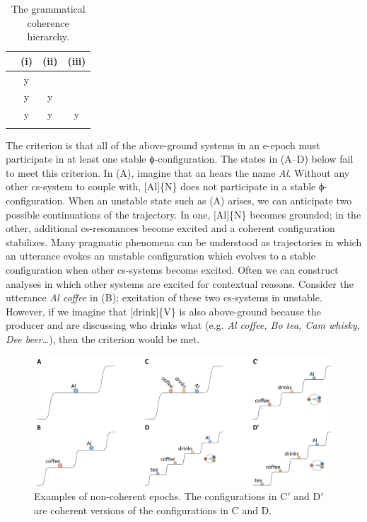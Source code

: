 \begin{table}
\begin{tabularx}{.66\textwidth}{rCCC}
\lsptoprule
& (i) & (ii) & (iii)\\
\midrule 
\raggedleft {} & y &  & \\
\raggedleft {} & y & y & \\
\raggedleft {} & y & y & y\\
\lspbottomrule
\end{tabularx}
\caption{The grammatical coherence hierarchy.}\label{tab:6:1}
\end{table}
  The  criterion is that all of the above-ground systems in an e-epoch must participate in at least one stable ϕ-con\-fi\-gu\-ra\-tion. The states in {}(A--D) below fail to meet this criterion. In (A), imagine that an  hears the name \textit{Al}. Without any other cs-sys\-tem to couple with, [Al]\{N\} does not participate in a stable ϕ-con\-fi\-gu\-ra\-tion. When an unstable state such as (A) arises, we can anticipate two possible continuations of the trajectory. In one, [Al]\{N\} becomes grounded; in the other, additional cs-resonances become excited and a coherent configuration stabilizes. Many pragmatic phenomena can be understood as trajectories in which an utterance evokes an unstable configuration which evolves to a stable configuration when other cs-sys\-tems become excited. Often we can construct analyses in which other systems are excited for contextual reasons. Consider the utterance \textit{Al coffee} in (B); excitation of these two cs-sys\-tems in unstable. However, if we imagine that [drink]\{V\} is also above-ground because the producer and  are discussing who drinks what (e.g. \textit{Al coffee, Bo tea, Cam whisky, Dee beer…}), then the  criterion would be met.

  
\begin{figure}
\includegraphics[width=\textwidth]{figures/Tilsen-img124.png}
\caption{Examples of non-coherent epochs. The configurations in C$'$ and D$'$ are coherent versions of the configurations in C and D.}
\label{fig:6:5}
\end{figure}
 

